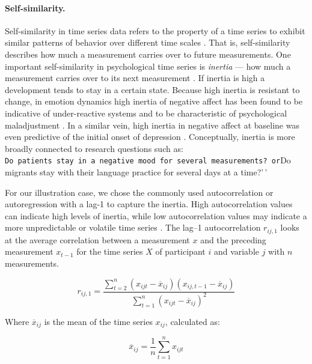 \documentclass[man, 12pt, a4paper, floatsintext]{apa7}
\theoremstyle{break}
\theoremstyle{plain}
\begin{document}
\paragraph{Self-similarity.}

Self-similarity in time series data refers to the property of a time
series to exhibit similar patterns of behavior over different time
scales \citep{dmello2021}. That is, self-similarity describes how much a
measurement carries over to future measurements. One important
self-similarity in psychological time series is \textit{inertia} --- how
much a measurement carries over to its next measurement
\citep{kuppens2010, suls1998}. If inertia is high a development tends to
stay in a certain state. Because high inertia is resistant to change, in
emotion dynamics high inertia of negative affect has been found to be
indicative of under-reactive systems and to be characteristic of
psychological maladjustment \citep{kuppens2010}. In a similar vein, high
inertia in negative affect at baseline was even predictive of the
initial onset of depression \citep{kuppens2012}. Conceptually, inertia
is more broadly connected to research questions such as:
\texttt{Do\ patients\ stay\ in\ a\ negative\ mood\ for\ several\ measurements?\textquotesingle{}\textquotesingle{}\ or}Do
migrants stay with their language practice for several days at a
time?'\,'

For our illustration case, we chose the commonly used autocorrelation or
autoregression with a lag-1 to capture the inertia. High autocorrelation
values can indicate high levels of inertia, while low autocorrelation
values may indicate a more unpredictable or volatile time series
\citep{dejonckheere2019}. The lag--1 autocorrelation \(r_{ij,1}\) looks
at the average correlation between a measurement \(x\) and the preceding
measurement \(x_{t-1}\) for the time series \(X\) of participant \(i\)
and variable \(j\) with \(n\) measurements.

\begin{equation} \label{eq:ar}
  r_{ij,1} = \frac{\sum_{t=2}^{n}(x_{ijt}-\overline{x}_{ij})(x_{ij,t-1}-\overline{x}_{ij})}{\sum_{t=1}^{n}(x_{ijt}-\overline{x}_{ij})^2}
\end{equation}

Where \(\overline{x}_{ij}\) is the mean of the time series \(x_{ij}\),
calculated as:

\begin{equation} \label{eq:mean_for_ar1}
  \overline{x}_{ij} = \frac{1}{n} \sum_{t=1}^{n} x_{ijt}
\end{equation}
\end{document}
